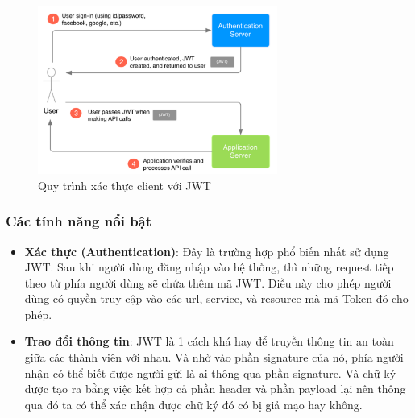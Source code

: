 \begin{figure}[H]
    \centering
    \includegraphics[width=0.7\textwidth]{Images/technology/jwt authentication.png}
    \caption{Quy trình xác thực client với JWT}
\end{figure}
\subsubsection{Các tính năng nổi bật}
\begin{itemize}
    \item \textbf{Xác thực (Authentication)}: Đây là trường hợp phổ biến nhất sử dụng JWT. Sau khi người dùng đăng nhập vào hệ thống, thì những request tiếp theo từ phía người dùng sẽ chứa thêm mã JWT. Điều này cho phép người dùng có quyền truy cập vào các url, service, và resource mà mã Token đó cho phép.
    \item \textbf{Trao đổi thông tin}: JWT là 1 cách khá hay để truyền thông tin an toàn giữa các thành viên với nhau. Và nhờ vào phần signature của nó, phía người nhận có thể biết được người gửi là ai thông qua phần signature. Và chữ ký được tạo ra bằng việc kết hợp cả phần header và phần payload lại nên thông qua đó ta có thể xác nhận được chữ ký đó có bị giả mạo hay không.
\end{itemize}

